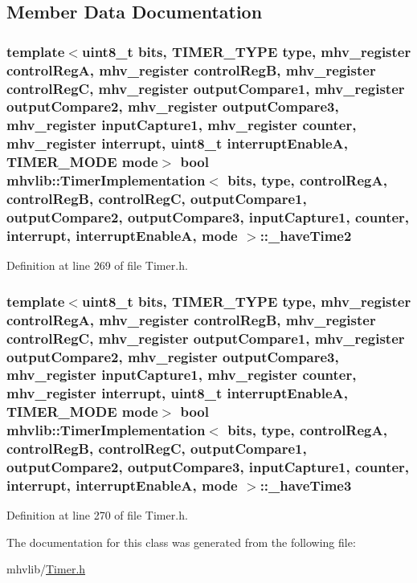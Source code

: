 \subsection{Member Data Documentation}
\hypertarget{classmhvlib_1_1_timer_implementation_a47a4861cf076333bcf6c320c993bec90}{
\subsubsection[{\-\_\-have\-Time2}]{\setlength{\rightskip}{0pt plus 5cm}template$<$uint8\-\_\-t bits, T\-I\-M\-E\-R\-\_\-\-T\-Y\-P\-E type, mhv\-\_\-register control\-Reg\-A, mhv\-\_\-register control\-Reg\-B, mhv\-\_\-register control\-Reg\-C, mhv\-\_\-register output\-Compare1, mhv\-\_\-register output\-Compare2, mhv\-\_\-register output\-Compare3, mhv\-\_\-register input\-Capture1, mhv\-\_\-register counter, mhv\-\_\-register interrupt, uint8\-\_\-t interrupt\-Enable\-A, T\-I\-M\-E\-R\-\_\-\-M\-O\-D\-E mode$>$ bool {\bf mhvlib\-::\-Timer\-Implementation}$<$ bits, type, control\-Reg\-A, control\-Reg\-B, control\-Reg\-C, output\-Compare1, output\-Compare2, output\-Compare3, input\-Capture1, counter, interrupt, interrupt\-Enable\-A, mode $>$\-::\-\_\-have\-Time2\hspace{0.3cm}{\ttfamily [protected]}}}\label{classmhvlib_1_1_timer_implementation_a47a4861cf076333bcf6c320c993bec90}


Definition at line 269 of file Timer.\-h.

\hypertarget{classmhvlib_1_1_timer_implementation_a35ab0a13feb6011e01f5d9b850ef15e4}{
\subsubsection[{\-\_\-have\-Time3}]{\setlength{\rightskip}{0pt plus 5cm}template$<$uint8\-\_\-t bits, T\-I\-M\-E\-R\-\_\-\-T\-Y\-P\-E type, mhv\-\_\-register control\-Reg\-A, mhv\-\_\-register control\-Reg\-B, mhv\-\_\-register control\-Reg\-C, mhv\-\_\-register output\-Compare1, mhv\-\_\-register output\-Compare2, mhv\-\_\-register output\-Compare3, mhv\-\_\-register input\-Capture1, mhv\-\_\-register counter, mhv\-\_\-register interrupt, uint8\-\_\-t interrupt\-Enable\-A, T\-I\-M\-E\-R\-\_\-\-M\-O\-D\-E mode$>$ bool {\bf mhvlib\-::\-Timer\-Implementation}$<$ bits, type, control\-Reg\-A, control\-Reg\-B, control\-Reg\-C, output\-Compare1, output\-Compare2, output\-Compare3, input\-Capture1, counter, interrupt, interrupt\-Enable\-A, mode $>$\-::\-\_\-have\-Time3\hspace{0.3cm}{\ttfamily [protected]}}}\label{classmhvlib_1_1_timer_implementation_a35ab0a13feb6011e01f5d9b850ef15e4}


Definition at line 270 of file Timer.\-h.



The documentation for this class was generated from the following file\-:\begin{DoxyCompactItemize}
\item 
mhvlib/\hyperlink{_timer_8h}{Timer.\-h}\end{DoxyCompactItemize}
